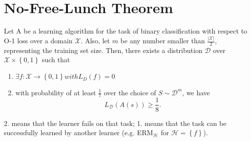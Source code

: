 \documentclass[10pt,a4paper]{article}
\theoremstyle{definition}
\theoremstyle{plain}
\begin{document}
\section{No-Free-Lunch Theorem}
Let A be a learning algorithm for the task of binary classification with respect to O-1 loss over a domain $\mathcal{X}$. Also, let $m$ be any number smaller than ${\frac{|\mathcal{X}|}{2}}$, representing the training set size. Then, there exists a distribution $\mathcal{D}$ over $\mathcal{X} \times \left\{0, 1\right\}$ such that
\begin{enumerate}
	\item $\exists f: \mathcal{X} \to \left\{0,1\right\} with L_D(f) = 0$
	 \item with probability of at least $\frac{1}{7}$ over the choice of $S \sim \mathcal{D}^m$, we have\\
	 $$ L_\mathcal{D}\left(A(s)\right) \geq \frac{1}{8}.$$
\end{enumerate}
2. means that the learner fails on that task; 1. means that the task can be successfully learned by another learner (e.g. ERM$_{\mathcal{H}}$ for $\mathcal{H} = \left\{f\right\}$).
\end{document}
